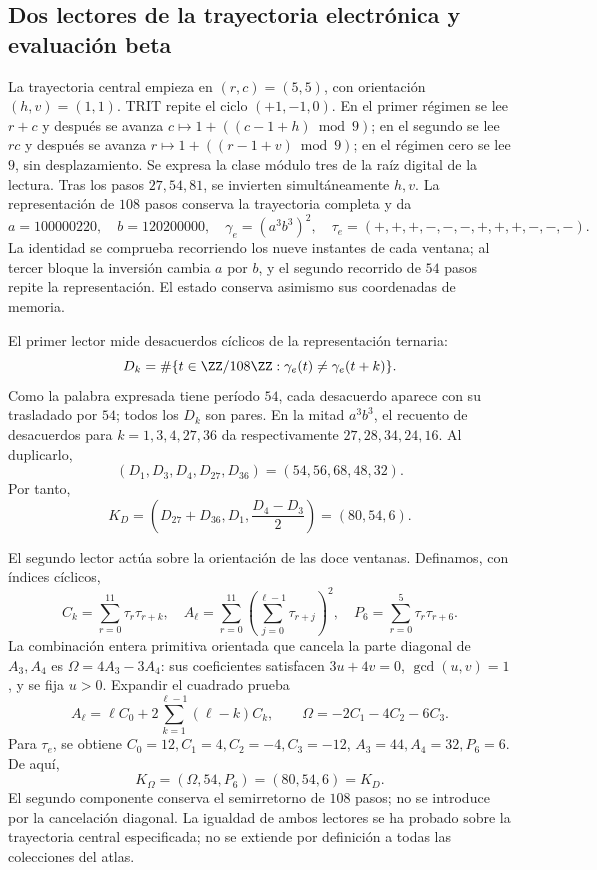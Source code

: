 \subsection{Dos lectores de la trayectoria electrónica y evaluación beta}
\label{vi:dep:beta}

La trayectoria central empieza en \((r,c)=(5,5)\), con
orientación \((h,v)=(1,1)\). TRIT repite el ciclo \((+1,-1,0)\).
En el primer régimen se lee \(r+c\) y después se avanza
\(c\mapsto1+((c-1+h)\bmod9)\); en el segundo se lee \(rc\) y
después se avanza \(r\mapsto1+((r-1+v)\bmod9)\); en el régimen
cero se lee \(9\), sin desplazamiento. Se expresa la clase módulo
tres de la raíz digital de la lectura. Tras los pasos \(27,54,81\),
se invierten simultáneamente \(h,v\). La representación de \(108\)
pasos conserva la trayectoria completa y da
\begin{equation}
 a=100000220,\quad b=120200000,\quad
 \gamma_e=(a^3b^3)^2,
 \quad\tau_e=(+,+,+,-,-,-,+,+,+,-,-,-).
 \label{vi:dep:trayectoria-electron}
\end{equation}
La identidad se comprueba recorriendo los nueve instantes de cada
ventana; al tercer bloque la inversión cambia \(a\) por \(b\),
y el segundo recorrido de \(54\) pasos repite la representación.
El estado conserva asimismo sus coordenadas de memoria.

El primer lector mide desacuerdos cíclicos de la representación ternaria:
\[
 D_k=\#\{t\in\ZZ/108\ZZ:\gamma_e(t)\ne\gamma_e(t+k)\}.
\]
Como la palabra expresada tiene período \(54\), cada desacuerdo
aparece con su trasladado por \(54\); todos los \(D_k\) son pares.
En la mitad \(a^3b^3\), el recuento de desacuerdos para
\(k=1,3,4,27,36\) da respectivamente \(27,28,34,24,16\).
Al duplicarlo,
\[
 (D_1,D_3,D_4,D_{27},D_{36})=(54,56,68,48,32).
\]
Por tanto,
\begin{equation}
 K_D=\left(D_{27}+D_{36},D_1,\frac{D_4-D_3}{2}\right)
     =(80,54,6).
 \label{vi:dep:KD}
\end{equation}

El segundo lector actúa sobre la orientación de las doce ventanas.
Definamos, con índices cíclicos,
\[
 C_k=\sum_{r=0}^{11}\tau_r\tau_{r+k},\quad
 A_\ell=\sum_{r=0}^{11}\left(\sum_{j=0}^{\ell-1}\tau_{r+j}\right)^2,
 \quad P_6=\sum_{r=0}^{5}\tau_r\tau_{r+6}.
\]
La combinación entera primitiva orientada que cancela la parte diagonal
de \(A_3,A_4\) es \(\Omega=4A_3-3A_4\): sus coeficientes
satisfacen \(3u+4v=0\), \(\gcd(u,v)=1\), y se fija \(u>0\).
Expandir el cuadrado prueba
\[
 A_\ell=\ell C_0+
     2\sum_{k=1}^{\ell-1}(\ell-k)C_k,
 \qquad\Omega=-2C_1-4C_2-6C_3.
\]
Para \(\tau_e\), se obtiene
\(C_0=12,C_1=4,C_2=-4,C_3=-12\),
\(A_3=44,A_4=32,P_6=6\). De aquí,
\begin{equation}
 K_\Omega=(\Omega,54,P_6)=(80,54,6)=K_D.
 \label{vi:dep:KOmega}
\end{equation}
El segundo componente conserva el semirretorno de \(108\) pasos;
no se introduce por la cancelación diagonal. La igualdad de ambos
lectores se ha probado sobre la trayectoria central especificada;
no se extiende por definición a todas las colecciones del atlas.

